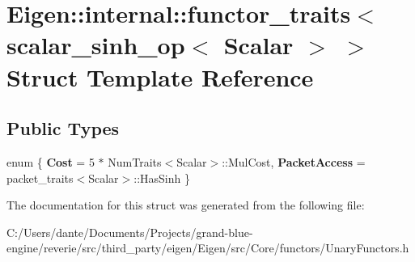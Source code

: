\hypertarget{struct_eigen_1_1internal_1_1functor__traits_3_01scalar__sinh__op_3_01_scalar_01_4_01_4}{}\section{Eigen\+::internal\+::functor\+\_\+traits$<$ scalar\+\_\+sinh\+\_\+op$<$ Scalar $>$ $>$ Struct Template Reference}
\label{struct_eigen_1_1internal_1_1functor__traits_3_01scalar__sinh__op_3_01_scalar_01_4_01_4}
\subsection*{Public Types}
\begin{DoxyCompactItemize}
\item 
\mbox{\label{struct_eigen_1_1internal_1_1functor__traits_3_01scalar__sinh__op_3_01_scalar_01_4_01_4_a108dfa49f3ece1e15d12be7ca890db77}} 
enum \{ {\bfseries Cost} = 5 $\ast$ Num\+Traits$<$Scalar$>$\+::Mul\+Cost, 
{\bfseries Packet\+Access} = packet\+\_\+traits$<$Scalar$>$\+::Has\+Sinh
 \}
\end{DoxyCompactItemize}


The documentation for this struct was generated from the following file\+:\begin{DoxyCompactItemize}
\item 
C\+:/\+Users/dante/\+Documents/\+Projects/grand-\/blue-\/engine/reverie/src/third\+\_\+party/eigen/\+Eigen/src/\+Core/functors/Unary\+Functors.\+h\end{DoxyCompactItemize}

